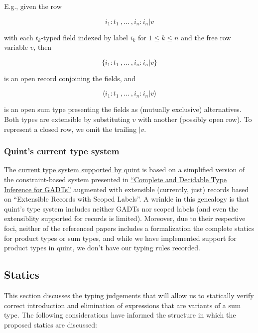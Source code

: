 \documentclass[11pt]{article}
\begin{document}
E.g., given the row

$$
i_1 : t_1 \ , \ldots \ , i_n : i_n | v
$$

with each \(t_k\)-typed field indexed by label \(i_k\) for
\(1 \le k \le n\) and the free row variable \(v\), then

$$
\{i_1 : t_1 \ , \ldots \ , i_n : i_n | v\}
$$

is an open record conjoining the fields, and

$$
\langle i_1 : t_1 \ , \ldots \ , i_n : i_n | v \rangle
$$

is an open sum type presenting the fields as (mutually exclusive)
alternatives. Both types are extensible by substituting \(v\) with
another (possibly open row). To represent a closed row, we omit the
trailing \(| v\).

\subsubsection{Quint's current type system}
\label{sec:org9b1b714}

The \href{https://github.com/informalsystems/quint/tree/main/doc/adr005-type-system.md}{current type system supported by quint} is based on a simplified version of
the constraint-based system presented in \href{https://www.microsoft.com/en-us/research/publication/complete-and-decidable-type-inference-for-gadts/}{``Complete and Decidable Type Inference
for GADTs''} augmented with extensible (currently, just) records based on
``Extensible Records with Scoped Labels''. A wrinkle in this genealogy is that
quint's type system includes neither GADTs nor scoped labels (and even the
extensiblity supported for records is limited). Moreover, due to their
respective foci, neither of the referenced papers includes a formalization the
complete statics for product types or sum types, and while we have implemented
support for product types in quint, we don't have our typing rules recorded.

\subsection{Statics}
\label{sec:org01c8751}
This section discusses the typing judgements that will allow us to
statically verify correct introduction and elimination of expressions
that are variants of a sum type. The following considerations have
informed the structure in which the proposed statics are discussed:
\end{document}
